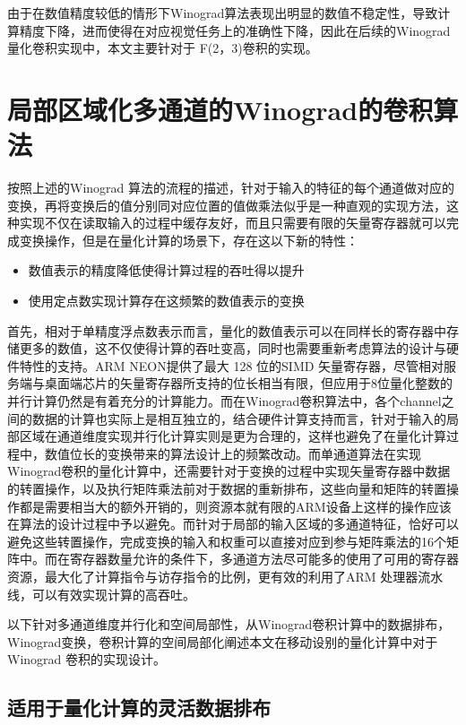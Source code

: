 由于在数值精度较低的情形下Winograd算法表现出明显的数值不稳定性，导致计算精度下降，进而使得在对应视觉任务上的准确性下降，因此在后续的Winograd 量化卷积实现中，本文主要针对于 F(2，3)卷积的实现。

\section{局部区域化多通道的Winograd的卷积算法}

按照上述的Winograd 算法的流程的描述，针对于输入的特征的每个通道做对应的变换，再将变换后的值分别同对应位置的值做乘法似乎是一种直观的实现方法，这种实现不仅在读取输入的过程中缓存友好，而且只需要有限的矢量寄存器就可以完成变换操作，但是在量化计算的场景下，存在这以下新的特性：
\begin{itemize}
  \item 数值表示的精度降低使得计算过程的吞吐得以提升
  \item 使用定点数实现计算存在这频繁的数值表示的变换
\end{itemize}

首先，相对于单精度浮点数表示而言，量化的数值表示可以在同样长的寄存器中存储更多的数值，这不仅使得计算的吞吐变高，同时也需要重新考虑算法的设计与硬件特性的支持。ARM NEON提供了最大 128 位的SIMD 矢量寄存器，尽管相对服务端与桌面端芯片的矢量寄存器所支持的位长相当有限，但应用于8位量化整数的并行计算仍然是有着充分的计算能力。而在Winograd卷积算法中，各个channel之间的数据的计算也实际上是相互独立的，结合硬件计算支持而言，针对于输入的局部区域在通道维度实现并行化计算实则是更为合理的，这样也避免了在量化计算过程中，数值位长的变换带来的算法设计上的频繁改动。而单通道算法在实现Winograd卷积的量化计算中，还需要针对于变换的过程中实现矢量寄存器中数据的转置操作，以及执行矩阵乘法前对于数据的重新排布，这些向量和矩阵的转置操作都是需要相当大的额外开销的，则资源本就有限的ARM设备上这样的操作应该在算法的设计过程中予以避免。而针对于局部的输入区域的多通道特征，恰好可以避免这些转置操作，完成变换的输入和权重可以直接对应到参与矩阵乘法的16个矩阵中。而在寄存器数量允许的条件下，多通道方法尽可能多的使用了可用的寄存器资源，最大化了计算指令与访存指令的比例，更有效的利用了ARM 处理器流水线，可以有效实现计算的高吞吐。

以下针对多通道维度并行化和空间局部性，从Winograd卷积计算中的数据排布，Winograd变换，卷积计算的空间局部化阐述本文在移动设别的量化计算中对于Winograd 卷积的实现设计。

\subsection{适用于量化计算的灵活数据排布}

